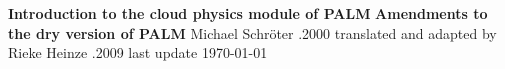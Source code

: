 \documentclass[11pt,a4paper]{scrartcl}
\begin{document}
\begin{center}
{\LARGE\bf\textsf{Introduction to the cloud physics module of PALM}}
\vspace{3.0mm}
\linebreak
{\Large\bf\textsf{\textendash Amendments to the dry version of PALM\textendash}}
\linebreak
\linebreak
 Michael Schr\"{o}ter
.2000
\linebreak
translated and adapted by 
\linebreak
Rieke Heinze 
.2009
\linebreak
\linebreak
last update
\linebreak
\today
\end{center}
\end{document}
